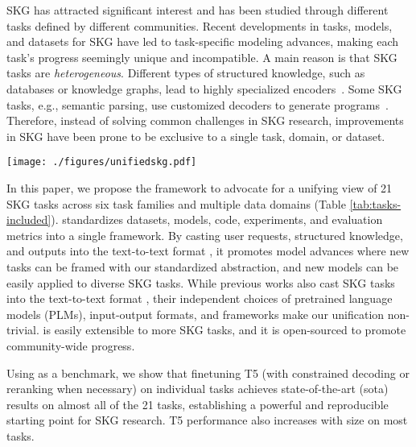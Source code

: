 \documentclass[11pt]{article}
\newcommand{\skg}{SKG\xspace}
\newcommand{\ntasks}{21\xspace}
\begin{document}
\skg has attracted significant interest and has been studied through different tasks defined by different communities.
Recent developments in tasks, models, and datasets for \skg have led to task-specific modeling advances, making each task's progress seemingly unique and incompatible.
A main reason is that \skg tasks are \textit{heterogeneous}.
Different types of structured knowledge, such as databases or knowledge graphs, lead to highly specialized encoders~\citep{kagnet-emnlp19,Herzig2020tapas,Wang2020RATSQLRS,yasunaga-etal-2021-qa}.
Some SKG tasks, e.g., semantic parsing, use customized decoders to generate programs~\cite{YinN18,ren2021lego}.
Therefore, instead of solving common challenges in \skg research, improvements in \skg have been prone to be exclusive to a single task, domain, or dataset.

\begin{figure*}[!t]
    \centering
    \texttt{[image: ./figures/unifiedskg.pdf]}
    \caption{Structured knowledge grounding (SKG) leverages structured knowledge to complete user requests.
    By casting inputs and outputs into the text-to-text format, \uskg standardizes datasets, models, code, experiments, and metrics for \ntasks \skg tasks.
}
\label{fig:skg}
\end{figure*}

In this paper, we propose the \uskg framework to advocate for a unifying view of \ntasks \skg tasks across six task families and multiple data domains (Table \ref{tab:tasks-included}).
\uskg standardizes datasets, models, code, experiments, and evaluation metrics into a single framework.
By casting user requests, structured knowledge, and outputs into the text-to-text format \cite{2020t5}, it promotes model advances where new tasks can be framed with our standardized abstraction, and new models can be easily applied to diverse \skg tasks.
While previous works also cast \skg tasks into the text-to-text format \cite{hosseini2020simple,Shaw2021CompositionalGA,liu2021tapex}, their independent choices of pretrained language models (PLMs), input-output formats, and frameworks make our unification non-trivial. 
\uskg is easily extensible to more \skg tasks, and it is open-sourced to promote community-wide progress.


Using \uskg as a benchmark, we show that finetuning T5 (with constrained decoding or reranking when necessary) on individual tasks achieves state-of-the-art (sota) results on almost all of the \ntasks tasks, establishing a powerful and reproducible starting point for \skg research. T5 performance also increases with size on most tasks. 
\end{document}
